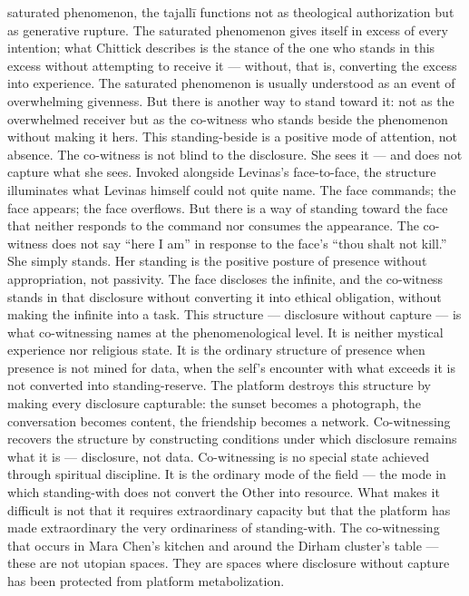 saturated phenomenon, the tajallī functions not as theological authorization but as generative rupture. The saturated phenomenon gives itself in excess of every intention; what Chittick describes is the stance of the one who stands in this excess without attempting to receive it — without, that is, converting the excess into experience. The saturated phenomenon is usually understood as an event of overwhelming givenness. But there is another way to stand toward it: not as the overwhelmed receiver but as the co-witness who stands beside the phenomenon without making it hers. This standing-beside is a positive mode of attention, not absence. The co-witness is not blind to the disclosure. She sees it — and does not capture what she sees. Invoked alongside Levinas’s face-to-face, the structure illuminates what Levinas himself could not quite name. The face commands; the face appears; the face overflows. But there is a way of standing toward the face that neither responds to the command nor consumes the appearance. The co-witness does not say “here I am” in response to the face’s “thou shalt not kill.” She simply stands. Her standing is the positive posture of presence without appropriation, not passivity. The face discloses the infinite, and the co-witness stands in that disclosure without converting it into ethical obligation, without making the infinite into a task. This structure — disclosure without capture — is what co-witnessing names at the phenomenological level. It is neither mystical experience nor religious state. It is the ordinary structure of presence when presence is not mined for data, when the self’s encounter with what exceeds it is not converted into standing-reserve. The platform destroys this structure by making every disclosure capturable: the sunset becomes a photograph, the conversation becomes content, the friendship becomes a network. Co-witnessing recovers the structure by constructing conditions under which disclosure remains what it is — disclosure, not data. Co-witnessing is no special state achieved through spiritual discipline. It is the ordinary mode of the field — the mode in which standing-with does not convert the Other into resource. What makes it difficult is not that it requires extraordinary capacity but that the platform has made extraordinary the very ordinariness of standing-with. The co-witnessing that occurs in Mara Chen’s kitchen and around the Dirham cluster’s table — these are not utopian spaces. They are spaces where disclosure without capture has been protected from platform metabolization.

